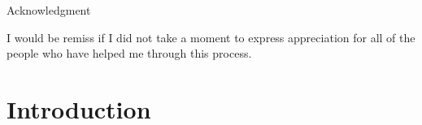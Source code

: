 \documentclass[12pt]{report}
\numberwithin{definition}{section}
\begin{document}
\begin{center}
Acknowledgment
\end{center}
    I would be remiss if I did not take a moment to express appreciation for all of the people who have helped me through this process.
    





	
\break

\tableofcontents


\newcommand{\comment}[1]{}


\break


\pagestyle{myheadings}

\section*{ Introduction }
\end{document}
